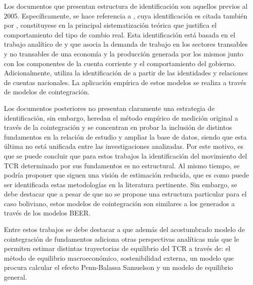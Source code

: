 \documentclass[12pt,letterpaper]{article}
\begin{document}
Los documentos que presentan estructura de identificación son aquellos previos al 2005. Específicamente, se hace referencia a \cite{lora2000tipo}, cuya identificación es citada también por \cite{marquez2003estimacion}, constituyese en la principal sistematización teórica que justifica el comportamiento del tipo de cambio real. Esta identificación está basada en el trabajo analítico de \cite{baffes1999red} y \cite{hinkle1999exchange} que asocia la demanda de trabajo en los sectores transables y no transables de una economía y la producción generada por los mismos junto con los componentes de la cuenta corriente y el comportamiento del gobierno. Adicionalmente, \cite{humerez2005reexaminando} utiliza la identificación de \cite{elbadawi1994estimating} a partir de las identidades y relaciones de cuentas nacionales. La aplicación empírica de estos modelos se realiza a través de modelos de cointegración.

Los documentos posteriores no presentan claramente una estrategia de identificación, sin embargo, heredan el método empírico de medición original a través de la cointegración y se concentran en probar la inclusión de distintos fundamentos en la relación de estudio y ampliar la base de datos, siendo que esta última no está unificada entre las investigaciones analizadas. Por este motivo, es que se puede concluir que para estos trabajos la identificación del movimiento del TCR determinado por sus fundamentos es no estructural. Al mismo tiempo, se podría proponer que siguen una visión de estimación reducida, que es como puede ser identificada estas metodologías en la literatura pertinente. Sin embargo, se debe destacar que a pesar de que no se propone una estructura particular para el caso boliviano, estos modelos de cointegración son similares a los generados a través de los modelos BEER.

Entre estos trabajos se debe destacar a \cite{cerezo2011tipo} que además del acostumbrado modelo de cointegración de fundamentos adiciona otras perspectivas analíticas más que le permiten estimar distintas trayectorias de equilibrio del TCR a través de: el método de equilibrio macroeconómico, sostenibilidad externa, un modelo que procura calcular el efecto Penn-Balassa Samuelson y un modelo de equilibrio general.
\end{document}
